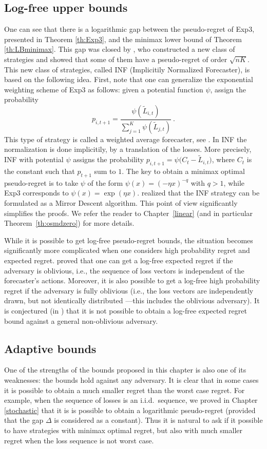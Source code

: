 \documentclass[11pt]{hackednow}
\renewcommand{\tilde}{\widetilde}
\begin{document}
\subsection{Log-free upper bounds} \label{sec:logfree}
One can see that there is a logarithmic gap between the pseudo-regret of Exp3, presented in Theorem \ref{th:Exp3}, and the minimax lower bound of Theorem \ref{th:LBminimax}. This gap was closed by \cite{AB09}, who constructed a new class of strategies and showed that some of them have a pseudo-regret of order $\sqrt{n K}$. This new class of strategies, called INF (Implicitily Normalized Forecaster), is based on the following idea. First, note that one can generalize the exponential weighting scheme of Exp3 as follows: given a potential function $\psi$, assign the probability 
\[
    p_{i,t+1}=\frac{\psi(\tilde{L}_{i,t})}{\sum_{j=1}^K \psi(\tilde{L}_{j,t})}~.
\]
This type of strategy is called a weighted average forecaster, see \cite[Chapter 2]{CL06}. In INF the normalization is done implicitily, by a translation of the losses. More precisely, INF with potential $\psi$ assigns the probability $p_{i,t+1} = \psi\bigl(C_t - \tilde{L}_{i,t}\bigr)$, where $C_t$ is the constant such that $p_{t+1}$ sum to $1$. The key to obtain a minimax optimal pseudo-regret is to take $\psi$ of the form $\psi(x) = (- \eta x)^{-q}$ with $q>1$, while Exp3 corresponds to $\psi(x) = \exp(\eta x)$. \cite{ABL11} realized that the INF strategy can be formulated as a Mirror Descent algorithm. This point of view significantly simplifies the proofs. We refer the reader to Chapter~\ref{linear} (and in particular Theorem~\ref{th:osmdzero}) for more details.

While it is possible to get log-free pseudo-regret bounds, the situation becomes significantly more complicated when one considers high probability regret and expected regret. \cite{AB10} proved that one can get a log-free expected regret if the adversary is oblivious, i.e., the sequence of loss vectors is independent of the forecaster's actions. Moreover, it is also possible to get a log-free high probability regret if the adversary is fully oblivious (i.e., the loss vectors are independently drawn, but not identically distributed ---this includes the oblivious adversary). It is conjectured (in \cite{AB10}) that it is not possible to obtain a log-free expected regret bound against a general non-oblivious adversary.

\subsection{Adaptive bounds}
One of the strengths of the bounds proposed in this chapter is also one of its weaknesses: the bounds hold against any adversary. It is clear that in some cases it is possible to obtain a much smaller regret than the worst case regret. For example, when the sequence of losses is an i.i.d.\ sequence, we proved in Chapter \ref{stochastic} that it is is possible to obtain a logarithmic pseudo-regret (provided that the gap $\Delta$ is considered as a constant). Thus it is natural to ask if it possible to have strategies with minimax optimal regret, but also with much smaller regret when the loss sequence is not worst case.
\end{document}
